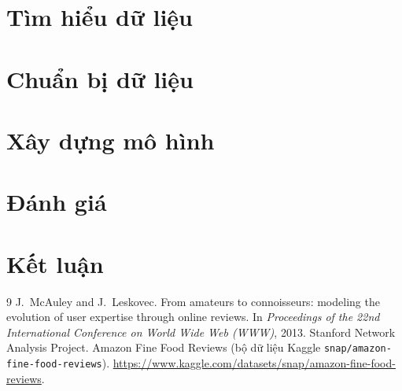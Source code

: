 \documentclass[a4paper,11pt]{report}
\begin{document}
\chapter{Tìm hiểu dữ liệu}
\label{ch:data-understanding}


\chapter{Chuẩn bị dữ liệu}
\label{ch:data-preparation}


\chapter{Xây dựng mô hình}
\label{ch:modeling}


\chapter{Đánh giá}
\label{ch:evaluation}


\chapter{Kết luận}
\label{ch:conclusion}


\begin{thebibliography}{9}
 J.~McAuley and J.~Leskovec. From amateurs to connoisseurs: modeling the evolution of user expertise through online reviews. In \emph{Proceedings of the 22nd International Conference on World Wide Web (WWW)}, 2013.
 Stanford Network Analysis Project. Amazon Fine Food Reviews (bộ dữ liệu Kaggle \texttt{snap/amazon-fine-food-reviews}). \url{https://www.kaggle.com/datasets/snap/amazon-fine-food-reviews}.
\end{thebibliography}
\end{document}
